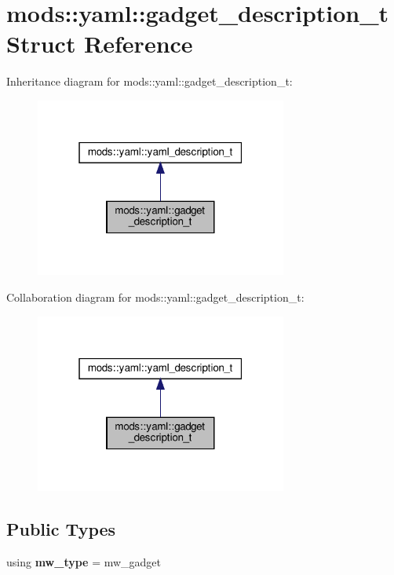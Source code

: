 \hypertarget{structmods_1_1yaml_1_1gadget__description__t}{}\section{mods\+:\+:yaml\+:\+:gadget\+\_\+description\+\_\+t Struct Reference}
\label{structmods_1_1yaml_1_1gadget__description__t}


Inheritance diagram for mods\+:\+:yaml\+:\+:gadget\+\_\+description\+\_\+t\+:
\nopagebreak
\begin{figure}[H]
\begin{center}
\leavevmode
\includegraphics[width=235pt]{structmods_1_1yaml_1_1gadget__description__t__inherit__graph}
\end{center}
\end{figure}


Collaboration diagram for mods\+:\+:yaml\+:\+:gadget\+\_\+description\+\_\+t\+:
\nopagebreak
\begin{figure}[H]
\begin{center}
\leavevmode
\includegraphics[width=235pt]{structmods_1_1yaml_1_1gadget__description__t__coll__graph}
\end{center}
\end{figure}
\subsection*{Public Types}
\begin{DoxyCompactItemize}
\item 
\mbox{\label{structmods_1_1yaml_1_1gadget__description__t_ad3c880621c2741aa91b5d3f63012c4a6}} 
using {\bfseries mw\+\_\+type} = mw\+\_\+gadget
\end{DoxyCompactItemize}
